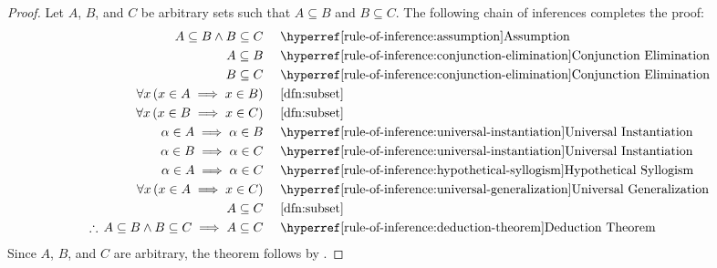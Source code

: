 \begin{proof}
    Let \( A \), \( B \), and \( C \) be arbitrary sets such that
    \( A \subseteq B \) and \( B \subseteq C \). The following chain
    of inferences completes the proof:
    \begin{equation*}
        \begin{aligned}
            A \subseteq B \land B \subseteq C& \\
            A \subseteq B& \\
            B \subseteq C& \\
            \forall x \, \mleft( x \in A \implies x \in B \mright)& \\
            \forall x \, \mleft( x \in B \implies x \in C \mright)& \\
            \alpha \in A \implies \alpha \in B& \\
            \alpha \in B \implies \alpha \in C& \\
            \alpha \in A \implies \alpha \in C& \\
            \forall x \, \mleft( x \in A \implies x \in C \mright)&\\
            A \subseteq C& \\
            \therefore \, A \subseteq B \land B \subseteq C
            \implies A \subseteq C& \\
        \end{aligned}
        \text{  }
        \begin{aligned}
            &\quad\text{\aref{rule-of-inference:assumption}{Assumption}} \\
            &\quad\text{\aref{rule-of-inference:conjunction-elimination}{Conjunction Elimination}} \\
            &\quad\text{\aref{rule-of-inference:conjunction-elimination}{Conjunction Elimination}} \\
            &\quad\text{\cref{dfn:subset}} \\
            &\quad\text{\cref{dfn:subset}} \\
            &\quad\text{\aref{rule-of-inference:universal-instantiation}{Universal Instantiation}} \\
            &\quad\text{\aref{rule-of-inference:universal-instantiation}{Universal Instantiation}} \\
            &\quad\text{\aref{rule-of-inference:hypothetical-syllogism}{Hypothetical Syllogism}} \\
            &\quad\text{\aref{rule-of-inference:universal-generalization}{Universal Generalization}} \\
            &\quad\text{\cref{dfn:subset}} \\
            &\quad\text{\aref{rule-of-inference:deduction-theorem}{Deduction Theorem}} \\
        \end{aligned}
    \end{equation*}
    Since \( A \), \( B \), and \( C \) are arbitrary, the theorem follows
    by .
\end{proof}

